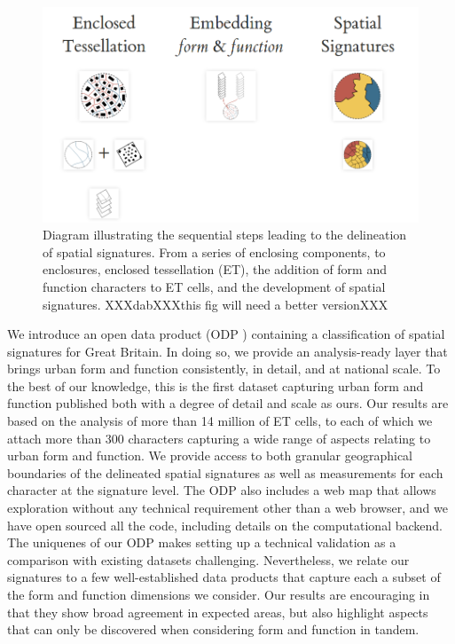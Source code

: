 \begin{figure}
        \includegraphics[width=\linewidth]{fig/workflow.png}
\caption{Diagram illustrating the sequential steps leading to the delineation of
spatial signatures. From a series of enclosing components, to enclosures,
enclosed tessellation (ET), the addition of form and function characters to ET
cells, and the development of spatial signatures.
XXXdabXXXthis fig will need a better versionXXX
}
\label{fig:workflow}
\end{figure}

We introduce an open data product (ODP \cite{odp_paper21}) containing a classification of
spatial signatures for Great Britain. In doing so, we provide an
analysis-ready layer that brings urban form and function consistently, in
detail, and at national scale. To the best of our knowledge, this is the first
dataset capturing urban form and function published both with a degree of detail and scale as
ours.
Our results are based on the analysis of more than 14 million of ET cells, to
each of which we attach more than 300 characters capturing a wide range of
aspects relating to urban form and function.
We provide access to both granular geographical boundaries of the delineated spatial signatures
as well as measurements for each character at the signature level.
The ODP also includes a web map that allows exploration without any technical
requirement other than a web browser, and we have open sourced all the code,
including details on the computational backend.
The uniquenes of our ODP makes setting up a technical validation as a
comparison with existing datasets challenging. Nevertheless, we relate our
signatures to a few well-established data products that capture each a subset
of the form and function dimensions we consider. Our results are encouraging
in that they show broad agreement in expected areas, but also highlight
aspects that can only be discovered when considering form and function in tandem.

